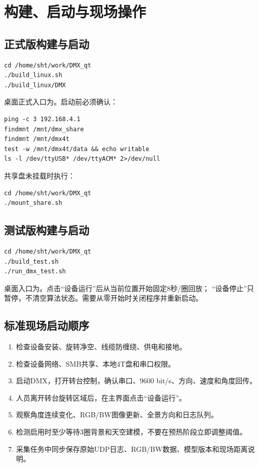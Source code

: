 \documentclass[UTF8,a4paper,11pt,openany]{ctexrep}
\begin{document}
\chapter{构建、启动与现场操作}

\section{正式版构建与启动}

\begin{verbatim}
cd /home/sht/work/DMX_qt
./build_linux.sh
./build_linux/DMX
\end{verbatim}

桌面正式入口为。启动前必须确认：

\begin{verbatim}
ping -c 3 192.168.4.1
findmnt /mnt/dmx_share
findmnt /mnt/dmx4t
test -w /mnt/dmx4t/data && echo writable
ls -l /dev/ttyUSB* /dev/ttyACM* 2>/dev/null
\end{verbatim}

共享盘未挂载时执行：

\begin{verbatim}
cd /home/sht/work/DMX_qt
./mount_share.sh
\end{verbatim}

\section{测试版构建与启动}

\begin{verbatim}
cd /home/sht/work/DMX_qt
./build_test.sh
./run_dmx_test.sh
\end{verbatim}

桌面入口为。点击“设备运行”后从当前位置开始固定8秒/圈回放；
“设备停止”只暂停，不清空算法状态。需要从零开始时关闭程序并重新启动。

\section{标准现场启动顺序}

\begin{enumerate}
  \item 检查设备安装、旋转净空、线缆防缠绕、供电和接地。
  \item 检查设备网络、SMB共享、本地4T盘和串口权限。
  \item 启动DMX，打开转台控制，确认串口、9600 bit/s、方向、速度和角度回传。
  \item 人员离开转台旋转区域后，在主界面点击“设备运行”。
  \item 观察角度连续变化、RGB/BW图像更新、全景方向和日志队列。
  \item 检测启用时至少等待3圈背景和天空建模，不要在预热阶段立即调整阈值。
  \item 采集任务中同步保存原始UDP日志、RGB/BW数据、模型版本和现场距离说明。
\end{enumerate}
\end{document}
